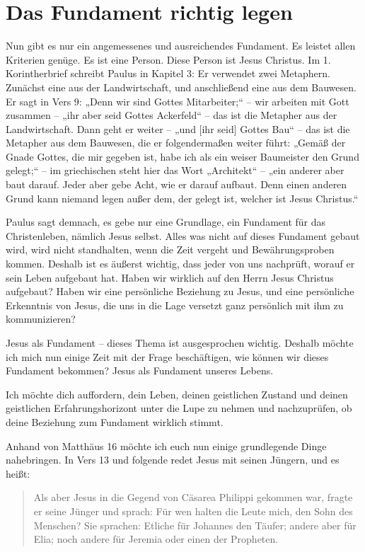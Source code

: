 \section{Das Fundament richtig legen}

Nun gibt es nur ein angemessenes und ausreichendes Fundament. 
Es leistet allen Kriterien genüge. 
Es ist eine Person. 
Diese Person ist Jesus Christus. 
Im 1. Korintherbrief schreibt Paulus in Kapitel 3: Er verwendet zwei Metaphern.
Zunächst eine aus der Landwirtschaft, und anschließend eine aus dem Bauwesen. 
Er sagt in Vers 9: „Denn wir sind Gottes Mitarbeiter;“ – wir arbeiten mit Gott zusammen – „ihr aber seid Gottes Ackerfeld“ – das ist die Metapher aus der Landwirtschaft. 
Dann geht er weiter – „und [ihr seid] Gottes Bau“ – das ist die Metapher aus dem Bauwesen, die er folgendermaßen weiter führt: „Gemäß der Gnade Gottes, die mir gegeben ist, habe ich als ein weiser Baumeister den Grund gelegt;“ – im griechischen steht hier das Wort „Architekt“ – „ein anderer aber baut darauf.
Jeder aber gebe Acht, wie er darauf aufbaut. 
Denn einen anderen Grund kann niemand legen außer dem, der gelegt ist, welcher ist Jesus Christus.“

Paulus sagt demnach, es gebe nur eine Grundlage, ein Fundament für das Christenleben, nämlich Jesus selbst. 
Alles was nicht auf dieses Fundament gebaut wird, wird nicht standhalten, wenn die Zeit vergeht und Bewährungsproben kommen. 
Deshalb ist es äußerst wichtig, dass jeder von uns nachprüft, worauf er sein Leben aufgebaut hat. 
Haben wir wirklich auf den Herrn Jesus Christus aufgebaut? 
Haben wir eine persönliche Beziehung zu Jesus, und eine persönliche Erkenntnis von Jesus, die uns in die Lage versetzt ganz persönlich mit ihm zu kommunizieren?

Jesus als Fundament – dieses Thema ist ausgesprochen wichtig. 
Deshalb möchte ich mich nun einige Zeit mit der Frage beschäftigen, wie können wir dieses Fundament bekommen? 
Jesus als Fundament unseres Lebens.

Ich möchte dich auffordern, dein Leben, deinen geistlichen Zustand und deinen geistlichen Erfahrungshorizont unter die Lupe zu nehmen und nachzuprüfen, ob deine Beziehung zum Fundament wirklich stimmt.

Anhand von Matthäus 16 möchte ich euch nun einige grundlegende Dinge nahebringen. 
In Vers 13 und folgende redet Jesus mit seinen Jüngern, und es heißt:

\begin{quotation}
  Als aber Jesus in die Gegend von Cäsarea Philippi gekommen war, fragte er seine Jünger und sprach: Für wen halten die Leute mich, den Sohn des Menschen? 
  Sie sprachen: Etliche für Johannes den Täufer; andere aber für Elia; noch andere für Jeremia oder einen der Propheten.
\end{quotation}

